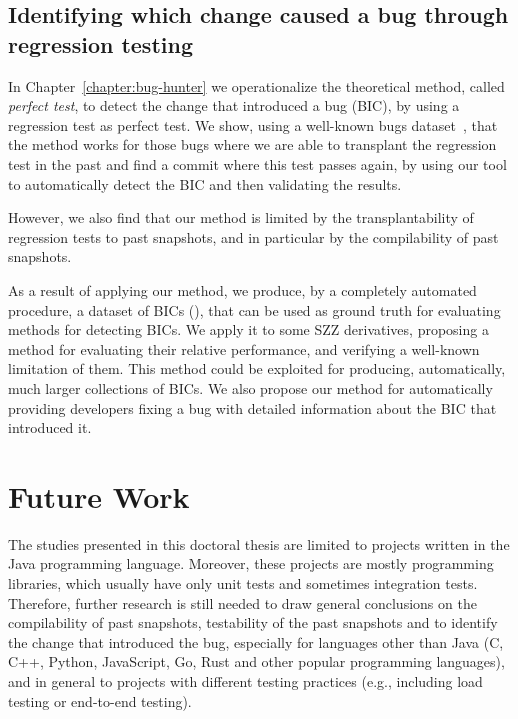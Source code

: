
\subsection{Identifying which change caused a bug through regression testing}

In Chapter~\ref{chapter:bug-hunter} we operationalize the theoretical method, called \emph{perfect test}, to detect the change that introduced a bug (BIC), by using a regression test as perfect test. We show, using a well-known bugs dataset~\cite{just2014defects4j}, that the method works for those bugs where we are able to transplant the regression test in the past and find a commit where this test passes again, by using our tool to automatically detect the BIC and then validating the results. 

However, we also find that our method is limited by the transplantability of regression tests to past snapshots, and in particular by the compilability of past snapshots.

As a result of applying our method, we produce, by a completely automated procedure, a dataset of BICs (\datasetName), that can be used as ground truth for evaluating methods for detecting BICs. 
We apply it to some SZZ derivatives, proposing a method for evaluating their relative performance, and verifying a well-known limitation of them. 
This method could be exploited for producing, automatically, much larger collections of BICs. 
We also propose our method for automatically providing developers fixing a bug with detailed information about the BIC that introduced it.

\section{Future Work}
\label{sec:future-work}

The studies presented in this doctoral thesis are limited to projects written in the Java programming language. Moreover, these projects are mostly programming libraries, which usually have only unit tests and sometimes integration tests.
Therefore, further research is still needed to draw general conclusions on the compilability of past snapshots, testability of the past snapshots and to identify the change that introduced the bug, especially for languages other than Java (C, C++, Python, JavaScript, Go, Rust and other popular programming languages), and in general to projects with different testing practices (e.g., including load testing or end-to-end testing).

